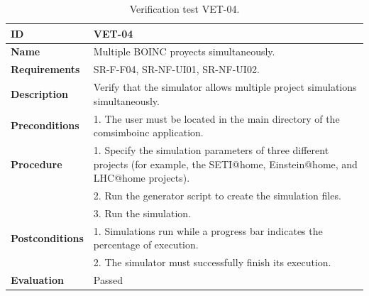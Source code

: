 \begin{center}
\begin{table}[htb]
\centering
\begin{tabular}{@{}p{2.5cm} p{13cm}@{}} 
\toprule
\textbf{ID} 					& VET-04 \\
\midrule
\textbf{Name} 				& Multiple BOINC proyects simultaneously. \\
\midrule
\textbf{Requirements} 		& SR-F-F04, SR-NF-UI01, SR-NF-UI02. \\
\midrule
\textbf{Description} 		& Verify that the simulator allows multiple project simulations simultaneously. \\
\midrule
\textbf{Preconditions}		& 1. The user must be located in the main directory of the \gls{comsimboinc} application. \\
\midrule
\textbf{Procedure}			& 1. Specify the simulation parameters of three different projects (for example, the SETI@home, Einstein@home, and LHC@home projects).\\
							& 2. Run the generator script to create the simulation files.\\
							& 3. Run the simulation.\\
\midrule
\textbf{Postconditions} 		& 1. Simulations run while a progress bar indicates the percentage of execution. \\
							& 2. The simulator must successfully finish its execution. \\
\midrule
\textbf{Evaluation} 			& Passed \\
\bottomrule
\end{tabular}
\caption{Verification test VET-04.}
\label{tab:vet04}
\end{table}
\end{center}


